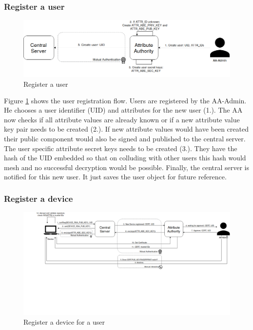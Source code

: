 \subsubsection{Register a user}
\begin{figure}[!h]
\centering
    \includegraphics[width=\linewidth]{img/user_register.png}
    \caption{Register a user}
    \label{fig:user-register}
\end{figure}

Figure \ref{fig:user-register} shows the user registration flow. Users are registered by the AA-Admin. He chooses a user identifier (UID) and attributes for the new user (1.).  The AA now checks if all attribute values are already known or if a new attribute value key pair needs to be created (2.). If new attribute values would have been created their public component would also be signed and published to the central server. The user specific attribute secret keys needs to be created (3.). They have the hash of the UID embedded so that on colluding with other users this hash would mesh and no successful decryption would be possible. Finally, the central server is notified for this new user. It just saves the user object for future reference.

\subsubsection{Register a device}
\label{sec:register-a-device}
\begin{figure}[!h]
\centering
    \includegraphics[width=\linewidth]{img/device_register.png}
    \caption{Register a device for a user}
    \label{fig:device-register}
\end{figure}

